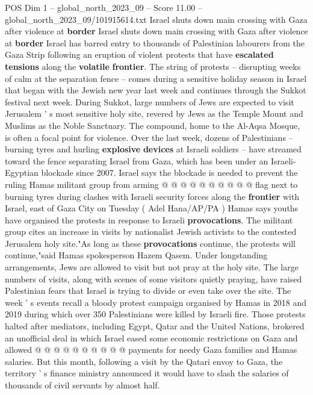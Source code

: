 \begin{textsample}{POS Dim 1 – global\_north\_2023\_09 – Score 11.00 – global\_north\_2023\_09/101915614.txt}  \label{ex:f1_pos_115}
Israel shuts down main crossing with Gaza after violence at \textbf{border} Israel shuts down main crossing with Gaza after violence at \textbf{border} Israel has barred entry to thousands of Palestinian labourers from the Gaza Strip following an eruption of violent protests that have \textbf{escalated} \textbf{tensions} along the \textbf{volatile} \textbf{frontier}.
The string of protests -- disrupting weeks of calm at the separation fence -- comes during a sensitive holiday season in Israel that began with the Jewish new year last week and continues through the Sukkot festival next week.
During Sukkot, large numbers of Jews are expected to visit Jerusalem ' s most sensitive holy site, revered by Jews as the Temple Mount and Muslims as the Noble Sanctuary.
The compound, home to the Al-Aqsa Mosque, is often a focal point for violence.
Over the last week, dozens of Palestinians -- burning tyres and hurling \textbf{explosive} \textbf{devices} at Israeli soldiers -- have streamed toward the fence separating Israel from Gaza, which has been under an Israeli-Egyptian blockade since 2007.
Israel says the blockade is needed to prevent the ruling Hamas militant group from arming @ @ @ @ @ @ @ @ @ @ flag next to burning tyres during clashes with Israeli security forces along the \textbf{frontier} with Israel, east of Gaza City on Tuesday ( Adel Hana/AP/PA ) Hamas says youths have organised the protests in response to Israeli \textbf{provocations}.
The militant group cites an increase in visits by nationalist Jewish activists to the contested Jerusalem holy site."As long as these \textbf{provocations} continue, the protests will continue,"said Hamas spokesperson Hazem Qasem.
Under longstanding arrangements, Jews are allowed to visit but not pray at the holy site.
The large numbers of visits, along with scenes of some visitors quietly praying, have raised Palestinian fears that Israel is trying to divide or even take over the site.
The week ' s events recall a bloody protest campaign organised by Hamas in 2018 and 2019 during which over 350 Palestinians were killed by Israeli fire.
Those protests halted after mediators, including Egypt, Qatar and the United Nations, brokered an unofficial deal in which Israel eased some economic restrictions on Gaza and allowed @ @ @ @ @ @ @ @ @ @ payments for needy Gaza families and Hamas salaries.
But this month, following a visit by the Qatari envoy to Gaza, the territory ' s finance ministry announced it would have to slash the salaries of thousands of civil servants by almost half.

\end{textsample}
